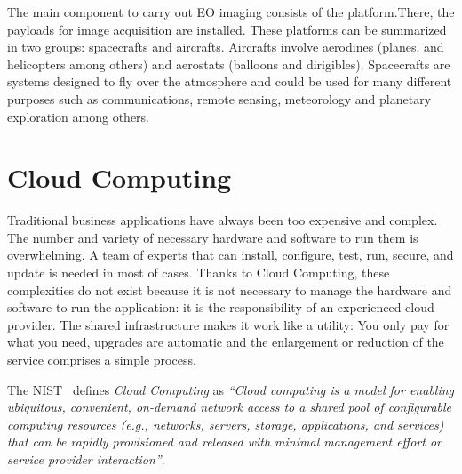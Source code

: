 The main component to carry out \ac{EO} imaging consists of the platform.There, the
payloads for image acquisition are installed. These platforms can be summarized
in two groups: spacecrafts and aircrafts. Aircrafts involve aerodines (planes,
and helicopters among others) and aerostats (balloons and
dirigibles). Spacecrafts are systems designed to fly over the atmosphere and
could be used for many different purposes such as communications, remote sensing,
meteorology and planetary exploration among others.


\section{Cloud Computing}

Traditional business applications have always been too expensive and complex. The number and variety of necessary hardware and software to run them
is overwhelming. A team of experts that can install, configure, test, run,
secure, and update is needed in most of cases.
Thanks to Cloud Computing, these
complexities do not exist because it is not necessary to manage the hardware
and software to run the application: it is the responsibility of an experienced cloud provider. The
shared infrastructure makes it work like a utility: You only pay for what you
need, upgrades are automatic and the enlargement or reduction of the service
comprises a simple process.

The NIST~\cite{Mell2011} defines \emph{Cloud Computing} as \emph{``Cloud computing is a model for enabling ubiquitous, convenient, on-demand network access to a shared
pool of configurable computing resources (e.g., networks, servers, storage, applications, and services) that
can be rapidly provisioned and released with minimal management effort or
service provider interaction''}.

